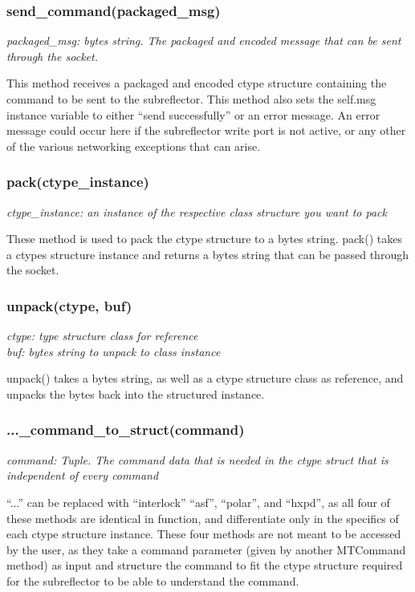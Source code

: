 \documentclass{article}
\begin{document}
\subsubsection*{send\_command(packaged\_msg)}
\emph{packaged\_msg: bytes string. The packaged and encoded message that can be sent through the socket.} 
\vspace{10pt}

This method receives a packaged and encoded ctype structure containing the command to be sent to the subreflector. This method also sets the self.msg instance variable to either ``send successfully'' or an error message. An error message could occur here if the subreflector write port is not active, or any other of the various networking exceptions that can arise. 


\subsubsection*{pack(ctype\_instance)}
\emph{ctype\_instance: an instance of the respective class structure you want to pack}
\vspace{10pt}

These method is used to pack the ctype structure to a bytes string. pack() takes a ctypes structure instance and  returns a bytes string that can be passed through the socket. 


\subsubsection*{unpack(ctype, buf)}
\emph{ctype: type structure class for reference}\\
\emph{buf: bytes string to unpack to class instance}
\vspace{10pt}

unpack() takes a bytes string, as well as a ctype structure class as reference, and unpacks the bytes back into the structured instance.

\subsubsection*{...\_command\_to\_struct(command)}
\emph{command: Tuple. The command data that is needed in the ctype struct that is independent of every command}
\vspace{10pt}

``...'' can be replaced with ``interlock'' ``asf'', ``polar'', and ``hxpd'', as all four of these methods are identical in function, and differentiate only in the specifics of each ctype structure instance. These four methods are not meant to be accessed by the user, as they take a command parameter (given by another MTCommand method) as input and structure the command to fit the ctype structure required for the subreflector to be able to understand the command.
\vspace{10pt}
\end{document}
